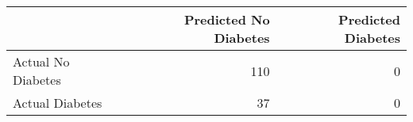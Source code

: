 \begin{tabular}{lrr}
\toprule
 & Predicted No Diabetes & Predicted Diabetes \\
\midrule
Actual No Diabetes & 110 & 0 \\
Actual Diabetes & 37 & 0 \\
\bottomrule
\end{tabular}
